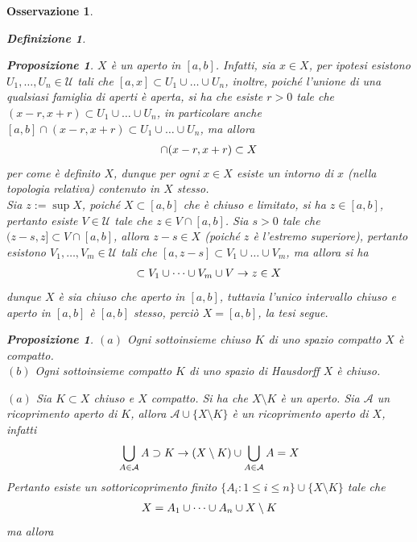 \documentclass[oneside, 11pt]{amsbook}
\makeatletter
\newcommand{\0}{{(0)}}
\newcommand{\3}{{(3)}}
\theoremstyle{colonplain}
\newtheorem{prop}[thm]{Proposizione}
\theoremstyle{colondefinition}
\newtheorem{defn}[thm]{Definizione}
\theoremstyle{colonremark}
\newtheorem{rmk}[thm]{Osservazione}
\numberwithin{equation}{chapter}
\renewcommand{\proofname}{Dimostrazione}
\renewenvironment{proof}[1][\proofname]{\par
  \pushQED{\end{proof}}%
  \normalfont \topsep6\p@\@plus6\p@\relax
  \trivlist
  \item[\hskip\labelsep\bfseries #1:]\ignorespaces
}{%
  \popQED\endtrivlist\@endpefalse
}
\makeatother
\begin{document}
\begin{rmk}
\begin{defn}
\begin{prop}
\begin{proof}
$X$ è un aperto in $[a, b]$. Infatti, sia $x \in X$, per ipotesi esistono $U_1, \dots, U_n \in \mathcal{U}$ tali che $[a, x] \subset U_1 \cup \dots \cup U_n$, inoltre, poiché l'unione di una qualsiasi famiglia di aperti è aperta, si ha che esiste $r > 0$ tale che $(x - r, x+ r) \subset U_1 \cup \dots \cup U_n$, in particolare anche $[a, b] \cap (x - r, x + r) \subset U_1 \cup \dots \cup U_n$, ma allora
\begin{align}
    [a, b] \cap (x - r, x + r) \subset X \notag
\end{align}
per come è definito $X$, dunque per ogni $x \in X$ esiste un intorno di $x$ (nella topologia relativa) contenuto in $X$ stesso. \\
Sia $z := \sup X$, poiché $X \subset [a, b]$ che è chiuso e limitato, si ha $z \in [a, b]$, pertanto esiste $V \in \mathcal{U}$ tale che $z \in V \cap [a, b]$. Sia $s > 0$ tale che $(z - s, z] \subset V \cap [a, b]$, allora $z - s \in X$ (poiché $z$ è l'estremo superiore), pertanto esistono $V_1, \dots, V_m \in \mathcal{U}$ tali che $[a, z - s] \subset V_1 \cup \dots \cup V_m$, ma allora si ha
\begin{align}
    [a, z] \subset V_1 \cup \dots \cup V_m \cup V \rightarrow z \in X \notag
\end{align}
dunque $X$ è sia chiuso che aperto in $[a, b]$, tuttavia l'unico intervallo chiuso e aperto in $[a, b]$ è $[a, b]$ stesso, perciò $X = [a, b]$, la tesi segue.
\end{proof}
\begin{prop}
$(a)$ Ogni sottoinsieme chiuso $K$ di uno spazio compatto $X$ è compatto. \\
$(b)$ Ogni sottoinsieme compatto $K$ di uno spazio di Hausdorff $X$ è chiuso.
\begin{proof}
$(a)$ Sia $K \subset X$ chiuso e $X$ compatto. Si ha che $X \setminus K$ è un aperto. Sia $\mathcal{A}$ un ricoprimento aperto di $K$, allora $\mathcal{A} \cup \{X \setminus K\}$ è un ricoprimento aperto di $X$, infatti
\begin{align}
    \bigcup_{A \in \mathcal{A}} A \supset K \rightarrow (X \setminus K) \cup \bigcup_{A \in \mathcal{A}} A = X \notag
\end{align}
Pertanto esiste un sottoricoprimento finito $\{A_i : 1 \leq i \leq n \} \cup \{ X \setminus K \}$ tale che
\begin{align}
    X = A_1 \cup \dots \cup A_n \cup X \setminus K \notag
\end{align}
ma allora
\begin{align}

\end{align}
\end{proof}
\end{prop}
\end{prop}
\end{defn}
\end{rmk}
\end{document}
